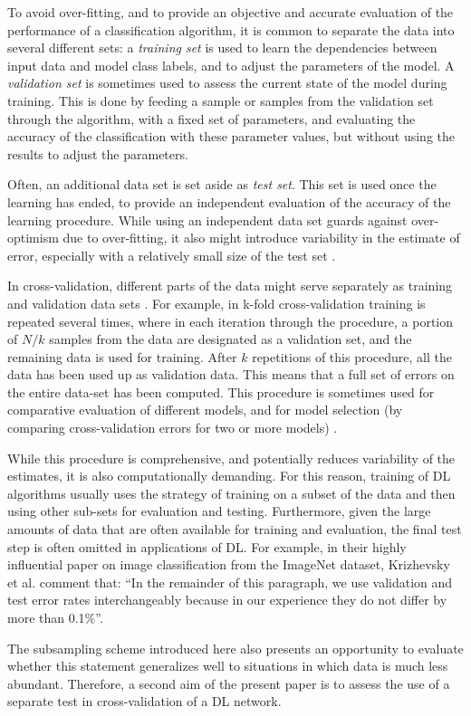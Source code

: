 To avoid over-fitting, and to provide an objective and accurate evaluation of
the performance of a classification algorithm, it is common to separate the data
into several different sets: a \emph{training set} is used to learn the
dependencies between input data and model class labels, and to adjust the
parameters of the model. A \emph{validation set} is sometimes used to assess the
current state of the model during training. This is done by feeding a sample or
samples from the validation set through the algorithm, with a fixed set of
parameters, and evaluating the accuracy of the classification with these
parameter values, but without using the results to adjust the parameters.

Often, an additional data set is set aside as \emph{test set}. This set is used
once the learning has ended, to provide an independent evaluation of the 
accuracy of the learning procedure. While using an independent data set guards 
against over-optimism due to over-fitting, it also might introduce 
variability in the estimate of error, especially with a relatively small size 
of the test set \citep{Efron1983-vu}.

In cross-validation, different parts of the data might serve separately as
training and validation data sets \citep{Stone1974-mo}. For example, in k-fold
cross-validation training is repeated several times, where in each iteration
through the procedure, a portion of $N/k$ samples from the data are designated
as a validation set, and the remaining data is used for training. After $k$
repetitions of this procedure, all the data has been used up as validation data.
This means that a full set of errors on the entire data-set has been computed.
This procedure is sometimes used for comparative evaluation of different models,
and for model selection (by comparing cross-validation errors for two or more
models) \citep{Stone1977-ez}.

While this procedure is comprehensive, and potentially reduces variability of
the estimates, it is also computationally demanding. For this reason, training
of DL algorithms usually uses the strategy of training on a subset of the data
and then using other sub-sets for evaluation and testing.  Furthermore, given
the large amounts of data that are often available for training and evaluation,
the final test step is often omitted in applications of DL. For example, in
their highly influential paper on image classification from the ImageNet
dataset, Krizhevsky et al. \citep{Krizhevsky2012-qc} comment that: ``In the
remainder of this paragraph, we use validation and test error rates
interchangeably because in our experience they do not differ by more than
0.1\%''.

The subsampling scheme introduced here also presents an opportunity to evaluate
whether this statement generalizes well to situations in which data is much less
abundant. Therefore, a second aim of the present paper is to assess the use of a
separate test in cross-validation of a DL network.
